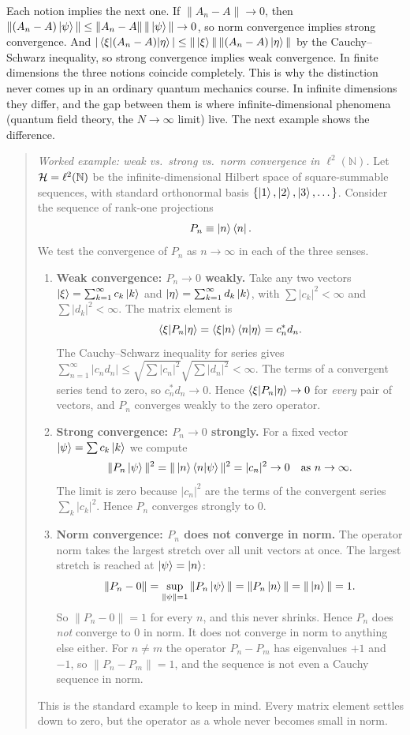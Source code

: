Each notion implies the next one. If $\|A_n-A\|\to0$, then $\|(A_n-A)\ket\psi\|\le\|A_n-A\|\,\|\ket\psi\|\to0$,
so norm convergence implies strong convergence. And $|\braket{\xi|(A_n-A)|\eta}|\le\|\ket\xi\|\,
\|(A_n-A)\ket\eta\|$ by the Cauchy--Schwarz inequality, so strong convergence implies weak convergence. In
finite dimensions the three notions coincide completely. This is why the distinction never comes up in an
ordinary quantum mechanics course. In infinite dimensions they differ, and the gap between them is where
infinite-dimensional phenomena (quantum field theory, the $N\to\infty$ limit) live. The next example shows
the difference.

\begin{quote}
\textit{Worked example: weak vs.\ strong vs.\ norm convergence in $\ell^2(\mathbb N)$.} Let
$\mathcal{H} = \ell^2(\mathbb N)$ be the infinite-dimensional Hilbert space of square-summable sequences, with
standard orthonormal basis $\{\ket 1, \ket 2, \ket 3, \dots\}$. Consider the sequence of rank-one projections
\[
P_n \equiv \ket n\bra n .
\]
We test the convergence of $P_n$ as $n\to\infty$ in each of the three senses.
\begin{enumerate}
\item \textbf{Weak convergence: $P_n \to 0$ weakly.} Take any two vectors
$\ket\xi = \sum_{k=1}^\infty c_k\ket k$ and $\ket\eta = \sum_{k=1}^\infty d_k\ket k$, with
$\sum |c_k|^2 < \infty$ and $\sum |d_k|^2 < \infty$. The matrix element is
\[
\braket{\xi|P_n|\eta} = \braket{\xi|n}\braket{n|\eta} = c_n^* d_n .
\]
The Cauchy--Schwarz inequality for series gives
$\sum_{n=1}^\infty |c_n d_n| \le \sqrt{\sum |c_n|^2}\sqrt{\sum |d_n|^2} < \infty$. The terms of a convergent
series tend to zero, so $c_n^* d_n\to0$. Hence $\braket{\xi|P_n|\eta} \to 0$ for \emph{every} pair of vectors,
and $P_n$ converges weakly to the zero operator.

\item \textbf{Strong convergence: $P_n \to 0$ strongly.} For a fixed vector $\ket\psi = \sum c_k\ket k$ we
compute
\[
\|P_n\ket\psi\|^2 = \|\ket n\braket{n|\psi}\|^2 = |c_n|^2 \to 0 \quad \text{as } n\to\infty .
\]
The limit is zero because $|c_n|^2$ are the terms of the convergent series $\sum_k|c_k|^2$. Hence $P_n$
converges strongly to $0$.

\item \textbf{Norm convergence: $P_n$ does not converge in norm.} The operator norm takes the largest stretch
over all unit vectors at once. The largest stretch is reached at $\ket\psi=\ket n$:
\[
\|P_n - 0\| = \sup_{\|\psi\|=1} \|P_n\ket\psi\| = \|P_n\ket n\| = \|\ket n\| = 1 .
\]
So $\|P_n - 0\| = 1$ for every $n$, and this never shrinks. Hence $P_n$ does \emph{not} converge to $0$ in
norm. It does not converge in norm to anything else either. For $n\ne m$ the operator $P_n-P_m$ has
eigenvalues $+1$ and $-1$, so $\|P_n-P_m\|=1$, and the sequence is not even a Cauchy sequence in norm.
\end{enumerate}
This is the standard example to keep in mind. Every matrix element settles down to zero, but the operator as
a whole never becomes small in norm.
\end{quote}

